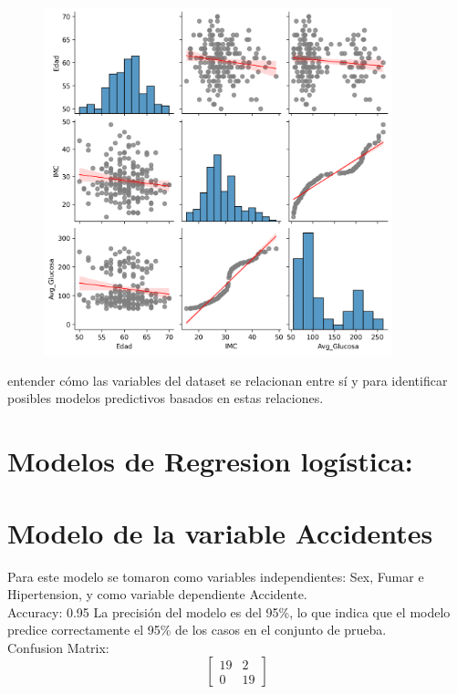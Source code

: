 \documentclass[a4paper, 12pt]{article}
\begin{document}
\begin{figure}[h]
    \centering
    \includegraphics[width=0.9\textwidth]{img/matriz_regresion_lineal.png}
\end{figure}

entender cómo las variables del dataset se relacionan entre sí y para identificar posibles modelos predictivos basados en estas relaciones.



\newpage

\section{Modelos de Regresion logística:}

\section{Modelo de la variable Accidentes}

Para este modelo se tomaron como variables independientes: Sex, Fumar e Hipertension, y como
variable dependiente Accidente.
\\
Accuracy: 0.95
La precisión del modelo es del 95\%, lo que indica que el modelo 
predice correctamente el 95\% de los casos en el conjunto de prueba.
\\
Confusion Matrix:
\[
\begin{bmatrix}
19 & 2 \\
0 & 19
\end{bmatrix}\]
\end{document}
